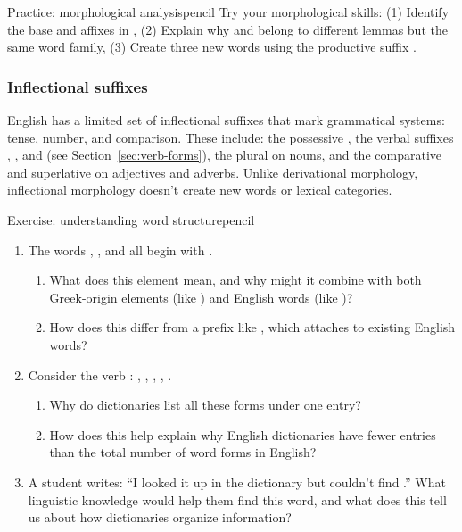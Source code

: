 \begin{tblsframedsymbol}{Practice: morphological analysis}{pencil}
Try your morphological skills: (1) Identify the base and affixes in , (2) Explain why  and  belong to different lemmas but the same word family, (3) Create three new words using the productive suffix .
\end{tblsframedsymbol}

\subsubsection*{Inflectional suffixes}

English has a limited set of inflectional suffixes that mark grammatical systems: tense, number, and comparison. These include: the possessive , the verbal suffixes , , and  (see Section~\ref{sec:verb-forms}), the plural  on nouns, and the comparative  and superlative  on adjectives and adverbs. Unlike derivational morphology, inflectional morphology doesn't create new words or lexical categories.

\begin{tblsframedsymbol}{Exercise: understanding word structure}{pencil}
\begin{enumerate}[noitemsep, leftmargin=*]
    \item The words , , and  all begin with .
    \begin{enumerate}[nosep]
        \item What does this element mean, and why might it combine with both Greek-origin elements (like ) and English words (like )?
        \item How does this differ from a prefix like , which attaches to existing English words?
    \end{enumerate}

    \item Consider the verb : , , , , .
    \begin{enumerate}[nosep]
        \item Why do dictionaries list all these forms under one entry?
        \item How does this help explain why English dictionaries have fewer entries than the total number of word forms in English?
    \end{enumerate}

    \item A student writes: \enquote{I looked it up in the dictionary but couldn't find .}
    What linguistic knowledge would help them find this word, and what does this tell us about how dictionaries organize information?
\end{enumerate}
\end{tblsframedsymbol}

